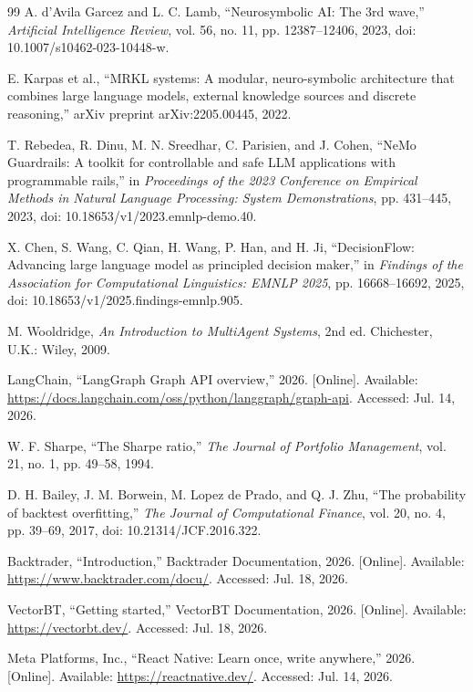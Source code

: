 \documentclass[12pt,a4paper,oneside]{report}
\begin{document}
\begin{thebibliography}{99}
A. d'Avila Garcez and L. C. Lamb, ``Neurosymbolic AI: The 3rd wave,'' \textit{Artificial Intelligence Review}, vol. 56, no. 11, pp. 12387--12406, 2023, doi: 10.1007/s10462-023-10448-w.

E. Karpas et al., ``MRKL systems: A modular, neuro-symbolic architecture that combines large language models, external knowledge sources and discrete reasoning,'' arXiv preprint arXiv:2205.00445, 2022.

T. Rebedea, R. Dinu, M. N. Sreedhar, C. Parisien, and J. Cohen, ``NeMo Guardrails: A toolkit for controllable and safe LLM applications with programmable rails,'' in \textit{Proceedings of the 2023 Conference on Empirical Methods in Natural Language Processing: System Demonstrations}, pp. 431--445, 2023, doi: 10.18653/v1/2023.emnlp-demo.40.

X. Chen, S. Wang, C. Qian, H. Wang, P. Han, and H. Ji, ``DecisionFlow: Advancing large language model as principled decision maker,'' in \textit{Findings of the Association for Computational Linguistics: EMNLP 2025}, pp. 16668--16692, 2025, doi: 10.18653/v1/2025.findings-emnlp.905.

M. Wooldridge, \textit{An Introduction to MultiAgent Systems}, 2nd ed. Chichester, U.K.: Wiley, 2009.

LangChain, ``LangGraph Graph API overview,'' 2026. [Online]. Available: \url{https://docs.langchain.com/oss/python/langgraph/graph-api}. Accessed: Jul. 14, 2026.

W. F. Sharpe, ``The Sharpe ratio,'' \textit{The Journal of Portfolio Management}, vol. 21, no. 1, pp. 49--58, 1994.

D. H. Bailey, J. M. Borwein, M. Lopez de Prado, and Q. J. Zhu, ``The probability of backtest overfitting,'' \textit{The Journal of Computational Finance}, vol. 20, no. 4, pp. 39--69, 2017, doi: 10.21314/JCF.2016.322.

Backtrader, ``Introduction,'' Backtrader Documentation, 2026. [Online]. Available: \url{https://www.backtrader.com/docu/}. Accessed: Jul. 18, 2026.

VectorBT, ``Getting started,'' VectorBT Documentation, 2026. [Online]. Available: \url{https://vectorbt.dev/}. Accessed: Jul. 18, 2026.

Meta Platforms, Inc., ``React Native: Learn once, write anywhere,'' 2026. [Online]. Available: \url{https://reactnative.dev/}. Accessed: Jul. 14, 2026.


\end{thebibliography}
\end{document}
